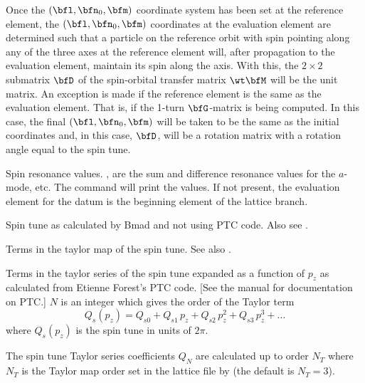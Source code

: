 \begin{description}
{{{{{{{{{Once the $(\bfl, \bfn_0, \bfm)$ coordinate system has been set at the reference element, the $(\bfl,
\bfn_0, \bfm)$ coordinates at the evaluation element are determined such that a particle on the
reference orbit with spin pointing along any of the three axes at the reference element will, after
propagation to the evaluation element, maintain its spin along the axis. With this, the $2\times2$
submatrix $\bfD$ of the spin-orbital transfer matrix $\wt\bfM$ will be the unit matrix.  An
exception is made if the reference element is the same as the evaluation element. That is, if the
1-turn $\bfG$-matrix is being computed. In this case, the final $(\bfl, \bfn_0, \bfm)$ will be taken
to be the same as the initial coordinates and, in this case, $\bfD$, will be a rotation matrix with
a rotation angle equal to the spin tune.

  \item[spin_res.a.sum, .a.diff, .b.sum, .b.diff, .c.sum, .c.diff] \Newline {}
Spin resonance values. ,  are the sum and difference resonance values for the
$a$-mode, etc. The  command will print the values. If not present, the
evaluation element for the datum is the beginning element of the lattice branch.

  \item[spin_tune] \Newline {}
Spin tune as calculated by Bmad and not using PTC code. Also see .

  \item[spin_map_ptc.$ijklmn$, where $i,j,k,l,m, n$ are 6 digits] \Newline {}
Terms in the taylor map of the spin tune. See also .

  \item[spin_tune_ptc.$N$, $N = 0, 1, 2, \ldots$] \Newline {}
Terms in the taylor series of the spin tune expanded as a function of $p_z$ as calculated from
Etienne Forest's PTC code. [See the \bmad manual for documentation on PTC.] $N$ is an integer which
gives the order of the Taylor term
\begin{equation}
  Q_s(p_z) = Q_{s0} + Q_{s1} \, p_z + Q_{s2} \, p_z^2 + Q_{s3} \, p_z^3 + \ldots
\end{equation}
where $Q_s(p_z)$ is the spin tune in units of $2\pi$.

The spin tune Taylor series coefficients $Q_N$ are calculated up to order $N_T$ where $N_T$ is the
Taylor map order set in the lattice file by  (the default is $N_T=3$). 

}}}}}}}}}
\end{description}

